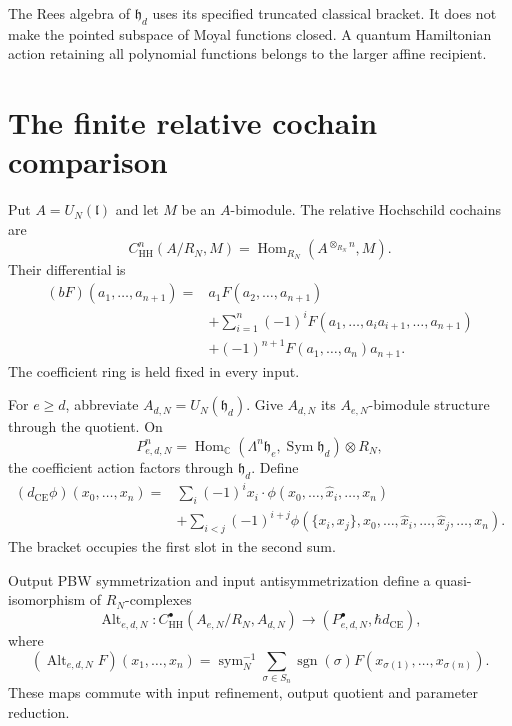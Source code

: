 The Rees algebra of $\mathfrak h_d$ uses its specified truncated
classical bracket. It does not make the pointed subspace of
Moyal functions closed. A quantum Hamiltonian action retaining
all polynomial functions belongs to the larger affine recipient.

\section{The finite relative cochain comparison}

Put $A=U_N(\mathfrak l)$ and let $M$ be an $A$-bimodule.
The relative Hochschild cochains are
\[
 C^n_{\mathrm{HH}}(A/R_N,M)
 =\operatorname{Hom}_{R_N}(A^{\otimes_{R_N}n},M).
\]
Their differential is
\begin{align*}
 (bF)(a_1,\ldots,a_{n+1})
 ={}&a_1F(a_2,\ldots,a_{n+1})\\
 &+\sum_{i=1}^n(-1)^i
 F(a_1,\ldots,a_i a_{i+1},\ldots,a_{n+1})\\
 &+(-1)^{n+1}F(a_1,\ldots,a_n)a_{n+1}.
\end{align*}
The coefficient ring is held fixed in every input.

For $e\geq d$, abbreviate $A_{d,N}=U_N(\mathfrak h_d)$.
Give $A_{d,N}$ its $A_{e,N}$-bimodule structure through the quotient.
On
\[
 P^n_{e,d,N}=
 \operatorname{Hom}_{\mathbb C}
  (\Lambda^n\mathfrak h_e,\operatorname{Sym}\mathfrak h_d)
       \otimes R_N,
\]
the coefficient action factors through $\mathfrak h_d$.
Define
\begin{align*}
 (d_{\mathrm{CE}}\phi)(x_0,\ldots,x_n)
 ={}&\sum_i(-1)^i x_i\cdot
       \phi(x_0,\ldots,\widehat x_i,\ldots,x_n)\\
 &+\sum_{i<j}(-1)^{i+j}
 \phi(\{x_i,x_j\},x_0,\ldots,\widehat x_i,\ldots,\widehat x_j,
                                                        \ldots,x_n).
\end{align*}
The bracket occupies the first slot in the second sum.

\begin{theorem}\label{mht:thm:rectangular-rees}
Output PBW symmetrization and input antisymmetrization define a
quasi-isomorphism of $R_N$-complexes
\[
 \operatorname{Alt}_{e,d,N}:
 C^\bullet_{\mathrm{HH}}(A_{e,N}/R_N,A_{d,N})
 \longrightarrow (P^\bullet_{e,d,N},\hbar d_{\mathrm{CE}}),
\]
where
\[
 (\operatorname{Alt}_{e,d,N}F)(x_1,\ldots,x_n)
 =\operatorname{sym}_N^{-1}
   \sum_{\sigma\in S_n}\operatorname{sgn}(\sigma)
       F(x_{\sigma(1)},\ldots,x_{\sigma(n)}).
\]
These maps commute with input refinement, output quotient and
parameter reduction.
\end{theorem}

